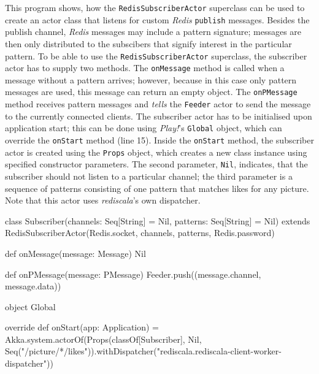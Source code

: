 \begin{program}
  \caption{This program shows, how the \texttt{RedisSubscriberActor} superclass can be used to create an actor class that listens for custom \textit{Redis} \texttt{publish} messages. Besides the publish channel, \textit{Redis} messages may include a pattern signature; messages are then only distributed to the subscibers that signify interest in the particular pattern. To be able to use the \texttt{RedisSubscriberActor} superclass, the subscriber actor has to supply two methods. The \texttt{onMessage} method is called when a message without a pattern arrives; however, because in this case only pattern messages are used, this message can return an empty object. The \texttt{onPMessage} method receives pattern messages and \textit{tells} the \texttt{Feeder} actor to send the message to the currently connected clients. The subscriber actor has to be initialised upon application start; this can be done using \textit{Play!}'s \texttt{Global} object, which can override the \texttt{onStart} method (line 15). Inside the \texttt{onStart} method, the subscriber actor is created using the \texttt{Props} object, which creates a new class instance using specified constructor parameters. The second parameter, \texttt{Nil}, indicates, that the subscriber should not listen to a particular channel; the third parameter is a sequence of patterns consisting of one pattern that matches likes for any picture. Note that this actor uses \textit{rediscala}'s own dispatcher.}
  \label{prog:subscriber}
  \begin{JavaCode}
class Subscriber(channels: Seq[String] = Nil, patterns: Seq[String] = Nil) extends RedisSubscriberActor(Redis.socket, channels, patterns, Redis.password) {

    def onMessage(message: Message) {
        Nil
    }

    def onPMessage(message: PMessage) {
        Feeder.push((message.channel, message.data))
    }

}

object Global {

    override def onStart(app: Application) = {
        Akka.system.actorOf(Props(classOf[Subscriber], Nil, Seq("/picture/*/likes")).withDispatcher("rediscala.rediscala-client-worker-dispatcher"))
    }

}
  \end{JavaCode}
\end{program}

